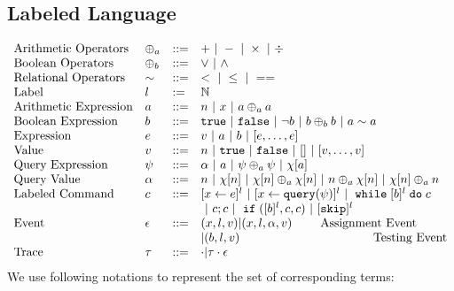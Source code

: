 %
%
\subsection{Labeled Language}
\[
\begin{array}{llll}
\mbox{Arithmetic Operators} 
& \oplus_a & ::= & + ~|~ - ~|~ \times 
%
~|~ \div \\  
\mbox{Boolean Operators} 
& \oplus_b & ::= & \lor ~|~ \land
\\
%
\mbox{Relational Operators} 
& \sim & ::= & < ~|~ \leq ~|~ == 
\\  
%
\mbox{Label} 
& l & := & \mathbb{N} 
\\ 
%
\mbox{Arithmetic Expression} 
& \aexpr & ::= & 
n ~|~ {x} ~|~ \aexpr \oplus_a \aexpr  
\\
%
\mbox{Boolean Expression} & \bexpr & ::= & 
%
\etrue ~|~ \efalse  ~|~ \neg \bexpr
 ~|~ \bexpr \oplus_b \bexpr
%
~|~ \aexpr \sim \aexpr 
\\
%
\mbox{Expression} & \expr & ::= & v ~|~ \aexpr \sep \bexpr ~|~ [\expr, \dots, \expr]
\\  
%
\mbox{Value} 
& v & ::= & { n \sep \etrue \sep \efalse ~|~ [] ~|~ [v, \dots, v]}  
\\
%
\mbox{Query Expression} 
& {\qexpr} & ::= 
& { \qval ~|~ \aexpr ~|~ \qexpr \oplus_a \qexpr ~|~ \chi[\aexpr]} 
\\
%
\mbox{Query Value} & \qval & ::= 
& {n ~|~ \chi[n] ~|~ \chi[n] \oplus_a  \chi[n] ~|~ n \oplus_a  \chi[n]
~|~ \chi[n] \oplus_a  n}
\\
%
\mbox{Labeled Command} 
& {c} & ::= &   [\assign {{x}}{ {\expr}}]^{l} ~|~  [\assign {{x} } {{\query(\qexpr)}}]^{l}
~|~ {\ewhile [ \bexpr ]^{l} \edo {c} }
\\
&&&
~|~ {c};{c}  
~|~ \eif([\bexpr]{}^l , {c}, {c}) 
~|~ [\eskip]^{l} 
\\
%
\mbox{Event} 
& \event & ::= & 
    ({x}, l, v) | ({x}, l, \qval, v)  ~~~~~~~ \mbox{Assignment Event} \\
&&& | (\bexpr, l, v)   ~~~~~~~~~~~~~~~~~~~~~~~~~~~~~~~~~ \mbox{Testing Event}
\\
%
\mbox{Trace} & \trace
& ::= & \cdot | \trace \cdot \event
\end{array}
\]
We use following notations to represent the set of corresponding terms:
